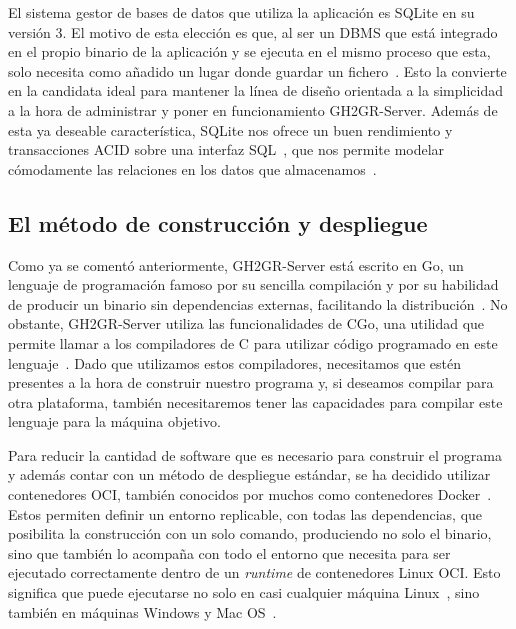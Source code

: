 El sistema gestor de bases de datos que utiliza la aplicación es SQLite en su versión 3. El motivo de esta elección es que, al ser un \acrshort{DBMS} que está integrado en el propio binario de la aplicación y se ejecuta en el mismo proceso que esta, solo necesita como añadido un lugar donde guardar un fichero~\cite{sqliteAboutSQLite}. Esto la convierte en la candidata ideal para mantener la línea de diseño orientada a la simplicidad a la hora de administrar y poner en funcionamiento GH2GR-Server. Además de esta ya deseable característica, SQLite nos ofrece un buen rendimiento y transacciones \acrshort{ACID} sobre una interfaz \acrshort{SQL}~\cite{sqliteAboutSQLite}, que nos permite modelar cómodamente las relaciones en los datos que almacenamos~\cite{Beaulieu2009-jq}.

\subsection{El método de construcción y despliegue} \label{title:gh2gr-server-build-and-deploy}
Como ya se comentó anteriormente, GH2GR-Server está escrito en Go, un lenguaje de programación famoso por su sencilla compilación y por su habilidad de producir un binario sin dependencias externas, facilitando la distribución~\cite{goDevelopmentCLI}. No obstante, GH2GR-Server utiliza las funcionalidades de CGo, una utilidad que permite llamar a los compiladores de C para utilizar código programado en este lenguaje~\cite{goCGo}. Dado que utilizamos estos compiladores, necesitamos que estén presentes a la hora de construir nuestro programa y, si deseamos compilar para otra plataforma, también necesitaremos tener las capacidades para compilar este lenguaje para la máquina objetivo.

Para reducir la cantidad de software que es necesario para construir el programa y además contar con un método de despliegue estándar, se ha decidido utilizar contenedores \acrshort{OCI}, también conocidos por muchos como contenedores Docker~\cite{ociFAQ}. Estos permiten definir un entorno replicable, con todas las dependencias, que posibilita la construcción con un solo comando, produciendo no solo el binario, sino que también lo acompaña con todo el entorno que necesita para ser ejecutado correctamente dentro de un \textit{runtime} de contenedores Linux \acrshort{OCI}. Esto significa que puede ejecutarse no solo en casi cualquier máquina Linux~\cite{mobyReadme, podmanWhatPodman}, sino también en máquinas Windows y Mac OS~\cite{dockerDockerDesktop, rancherdesktopIntroductionRancher, podmandesktopIntroductionPodman}.

